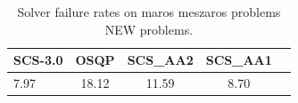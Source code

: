 \begin{table}
\centering
\caption{Solver failure rates on maros meszaros problems NEW problems.}
\label{t-maros meszaros problems NEW-failure}
\begin{tabular}{lcccc}
\toprule
 SCS-3.0 &  OSQP &  SCS\_AA2 &  SCS\_AA1 \\
\midrule
    7.97 & 18.12 &    11.59 &     8.70 \\
\bottomrule
\end{tabular}
\end{table}
